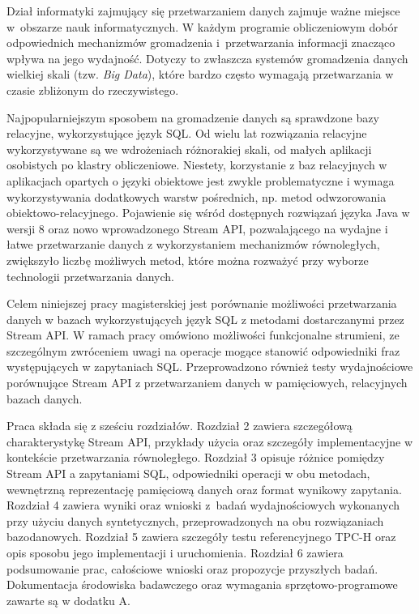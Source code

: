 \documentclass[12pt,twoside,openright]{extarticle}
\begin{document}
    Dział informatyki zajmujący się przetwarzaniem danych zajmuje ważne miejsce w~obszarze nauk informatycznych. W każdym programie obliczeniowym dobór odpowiednich mechanizmów gromadzenia i~przetwarzania informacji znacząco wpływa na jego wydajność. Dotyczy to zwłaszcza systemów gromadzenia danych wielkiej skali (tzw. \textit{Big Data}), które bardzo często wymagają przetwarzania w czasie zbliżonym do rzeczywistego.

    Najpopularniejszym sposobem na gromadzenie danych są sprawdzone bazy relacyjne, wykorzystujące język SQL. Od wielu lat rozwiązania relacyjne wykorzystywane są we wdrożeniach różnorakiej skali, od małych aplikacji osobistych po klastry obliczeniowe. Niestety, korzystanie z baz relacyjnych w aplikacjach opartych o języki obiektowe jest zwykle problematyczne i wymaga wykorzystywania dodatkowych warstw pośrednich, np. metod odwzorowania obiektowo-relacyjnego. Pojawienie się wśród dostępnych rozwiązań języka Java w wersji 8 oraz nowo wprowadzonego Stream API, pozwalającego na wydajne i łatwe przetwarzanie danych z wykorzystaniem mechanizmów równoległych, zwiększyło liczbę możliwych metod, które można rozważyć przy wyborze technologii przetwarzania danych.

	Celem niniejszej pracy magisterskiej jest porównanie możliwości przetwarzania danych w bazach wykorzystujących język SQL z metodami dostarczanymi przez Stream API. W ramach pracy omówiono możliwości funkcjonalne strumieni, ze szczególnym zwróceniem uwagi na operacje mogące stanowić odpowiedniki fraz występujących w zapytaniach SQL. Przeprowadzono również testy wydajnościowe porównujące Stream API z przetwarzaniem danych w pamięciowych, relacyjnych bazach danych.

    Praca składa się z sześciu rozdziałów. Rozdział 2 zawiera szczegółową charakterystykę Stream API, przykłady użycia oraz szczegóły implementacyjne w kontekście przetwarzania równoległego. Rozdział 3 opisuje różnice pomiędzy Stream API a zapytaniami SQL, odpowiedniki operacji w obu metodach, wewnętrzną reprezentację pamięciową danych oraz format wynikowy zapytania. Rozdział 4 zawiera wyniki oraz wnioski z~badań wydajnościowych wykonanych przy użyciu danych syntetycznych, przeprowadzonych na obu rozwiązaniach bazodanowych. Rozdział 5 zawiera szczegóły testu referencyjnego TPC-H oraz opis sposobu jego implementacji i uruchomienia. Rozdział 6 zawiera podsumowanie prac, całościowe wnioski oraz propozycje przyszłych badań. Dokumentacja środowiska badawczego oraz wymagania sprzętowo-programowe zawarte są w dodatku A.
\end{document}
